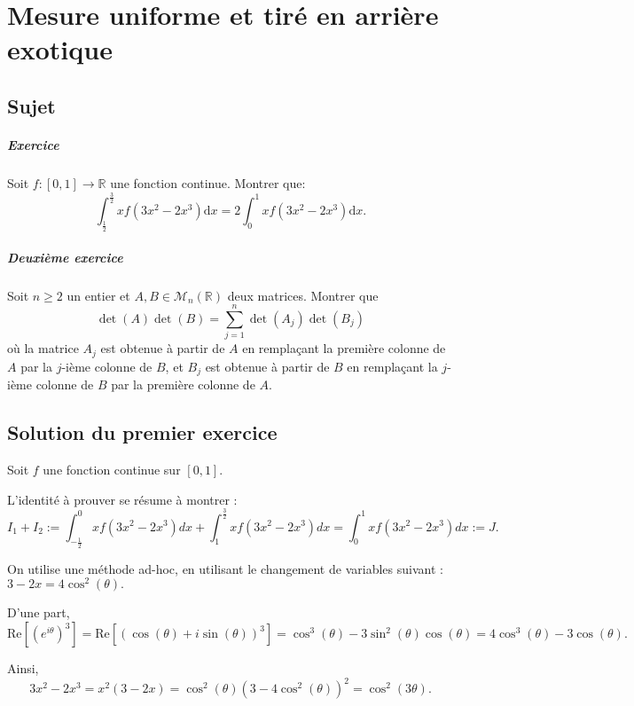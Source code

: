 \chapter{Mesure uniforme et tiré en arrière exotique}

\section{Sujet}

\paragraph{Exercice }
Soit $f: [0,1] \to \mathbb R$ une fonction continue. Montrer que:
  \[
  \int _{\frac 12} ^{\frac 32} x f(3x^2 - 2x^3) \mathrm d x = 2\int _0 ^1 x f(3x^2 -2x^3) \mathrm dx.
  \]
  
 \paragraph{Deuxième exercice}                              
 Soit $n \geqslant 2$ un entier et $A,B \in \mathscr M_n (\mathbb R)$ deux matrices. 
  Montrer que
 \[
 \det(A) \det (B) = \displaystyle \sum _{j=1}^{n} \det (A_j) \det (B_j)
 \]
 où la matrice $A_j$ est obtenue à partir de $A$ en remplaçant la première colonne de $A$ par la $j$-ième colonne de $B$, et $B_j$ est obtenue  à partir de $B$ en remplaçant la $j$-ième colonne de $B$ par la première colonne de $A$.

\section{Solution du premier exercice}

Soit $f$ une fonction continue sur $[0,1].$

L'identité à prouver se résume à montrer : $$I_{1}+I_{2}:=\int_{-\frac{1}{2}}^{0}xf(3x^{2}-2x^{3})dx+\int_{1}^{\frac{3}{2}}xf(3x^{2}-2x^{3})dx=\int_{0}^{1}xf(3x^{2}-2x^{3})dx:=J.$$

On utilise une méthode ad-hoc, en utilisant le changement de variables suivant : $3-2x=4\cos^{2}(\theta).$

D'une part, $$\mbox{Re}[(e^{i\theta})^{3}]=\mbox{Re}[\left(\cos(\theta)+i\sin(\theta)\right)^{3}]=\cos^{3}(\theta)-3\sin^{2}(\theta)\cos(\theta)=4\cos^{3}(\theta)-3\cos(\theta).$$

Ainsi, $$3x^{2}-2x^{3}=x^{2}(3-2x)=\cos^{2}(\theta)\left(3-4\cos^{2}(\theta)\right)^{2}=\cos^{2}(3\theta).$$

